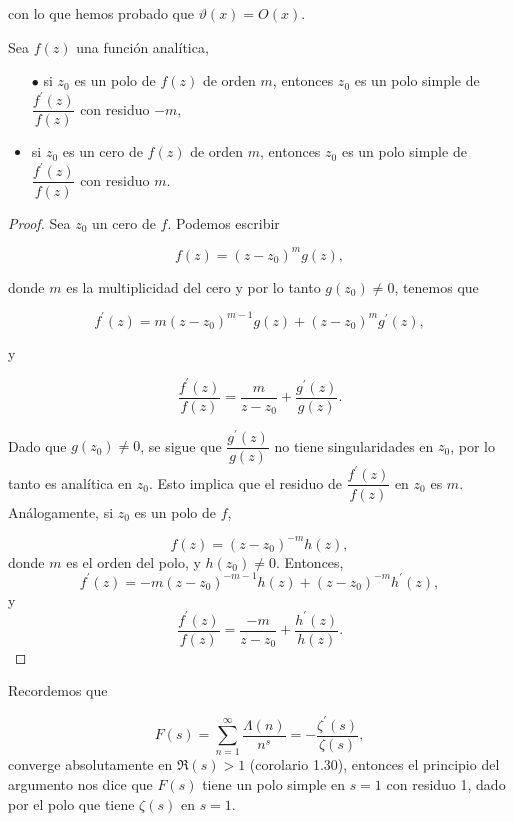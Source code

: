 con lo que hemos probado que $\vartheta(x)=O(x)$.\\

\begin{theorem}
    Sea $f(z)$ una función analítica, 

    \begin{itemize}
        \item[$\bullet$]si $z_0$ es un polo de $f(z)$ de orden $m$, entonces $z_0$ es un polo simple de $\dfrac{f^{\prime}(z)}{f(z)}$ con residuo $-m$,

        \item si $z_0$ es un cero de $f(z)$ de orden $m$, entonces $z_0$ es un polo simple de $\dfrac{f^{\prime}(z)}{f(z)}$ con residuo $m$.
    \end{itemize}
\end{theorem}

\begin{proof}
    Sea $z_0$ un cero de $f$. Podemos escribir 

$$
f(z) = \left(z - z_0\right)^m g(z),
$$

donde $m$ es la multiplicidad del cero y por lo tanto $g\left(z_0\right) \neq 0$, tenemos que

$$
f^{\prime}(z) = m\left(z - z_0\right)^{m-1} g(z) + \left(z - z_0\right)^m g^{\prime}(z),
$$

y

$$
\frac{f^{\prime}(z)}{f(z)} = \frac{m}{z - z_0} + \frac{g^{\prime}(z)}{g(z)}.
$$

Dado que $g\left(z_0\right) \neq 0$, se sigue que $\dfrac{g^{\prime}(z)}{g(z)}$ no tiene singularidades en $z_0$, por lo tanto es analítica en $z_0$. Esto implica que el residuo de $\dfrac{f^{\prime}(z)}{f(z)}$ en $z_0$ es $m$.\\

Análogamente, si $z_{0}$ es un polo de $f$, 

$$
f(z)=(z-z_{0})^{-m}h(z),
$$
donde $m$ es el orden del polo, y $h\left(z_0\right) \neq 0$. Entonces, 
$$
f^{\prime}(z) = -m\left(z - z_0\right)^{-m-1} h(z) + \left(z - z_0\right)^{-m} h^{\prime}(z),
$$
y
$$
\frac{f^{\prime}(z)}{f(z)} = \frac{-m}{z - z_0} + \frac{h^{\prime}(z)}{h(z)}.
$$
\end{proof}

Recordemos que

$$F(s)=\sum_{n=1}^{\infty} \frac{\Lambda(n)}{n^s}=-\frac{\zeta^{\prime}(s)}{\zeta(s)}
,$$
converge absolutamente en $\Re(s)>1$ (corolario 1.30), entonces el principio del argumento nos dice que $F(s)$ tiene un polo simple en $s=1$ con residuo 1, dado por el polo que tiene $\zeta(s)$ en $s=1$.\\

